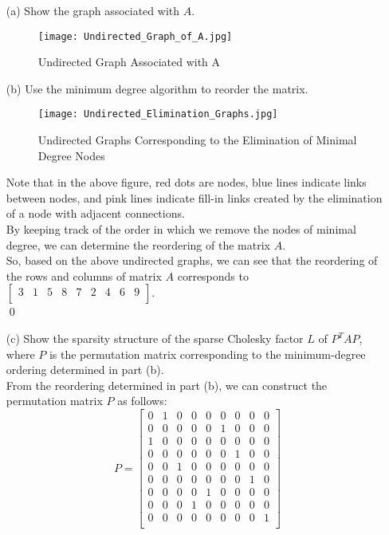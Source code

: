\documentclass[12pt]{article}
\begin{document}
\begin{itemize}

\item[(a)] Show the graph associated with $A$.\\

\begin{figure}[H]
\center
\texttt{[image: Undirected\_Graph\_of\_A.jpg]}
\caption{Undirected Graph Associated with A}
\end{figure}


\item[(b)] Use the minimum degree algorithm to reorder the matrix.\\

\begin{figure}[H]
\center
\texttt{[image: Undirected\_Elimination\_Graphs.jpg]}
\caption{Undirected Graphs Corresponding to the Elimination of Minimal Degree Nodes}
\end{figure}

Note that in the above figure, red dots are nodes, blue lines indicate links between nodes, and pink lines indicate fill-in links created by the elimination of a node with adjacent connections.\\

By keeping track of the order in which we remove the nodes of minimal degree, we can determine the reordering of the matrix $A$.\\
So, based on the above undirected graphs, we can see that the reordering of the rows and columns of matrix $A$ corresponds to     $\begin{bmatrix}
 3 & 1 & 5 & 8 & 7 & 2 & 4 & 6 & 9 \\
\end{bmatrix}.$\\
\qed

\item[(c)] Show the sparsity structure of the sparse Cholesky factor $L$ of $P^TAP$, where $P$ is the permutation matrix corresponding to the minimum-degree ordering determined in part (b).\\

From the reordering determined in part (b), we can construct the permutation matrix $P$ as follows:
$$P = \begin{bmatrix}
0 & 1 & 0 & 0 & 0 & 0 & 0 & 0 & 0 \\
0 & 0 & 0 & 0 & 0 & 1 & 0 & 0 & 0 \\
1 & 0 & 0 & 0 & 0 & 0 & 0 & 0 & 0 \\
0 & 0 & 0 & 0 & 0 & 0 & 1 & 0 & 0 \\
0 & 0 & 1 & 0 & 0 & 0 & 0 & 0 & 0 \\
0 & 0 & 0 & 0 & 0 & 0 & 0 & 1 & 0 \\
0 & 0 & 0 & 0 & 1 & 0 & 0 & 0 & 0 \\
0 & 0 & 0 & 1 & 0 & 0 & 0 & 0 & 0 \\
0 & 0 & 0 & 0 & 0 & 0 & 0 & 0 & 1 \\
\end{bmatrix}$$


\end{itemize}
\end{document}

